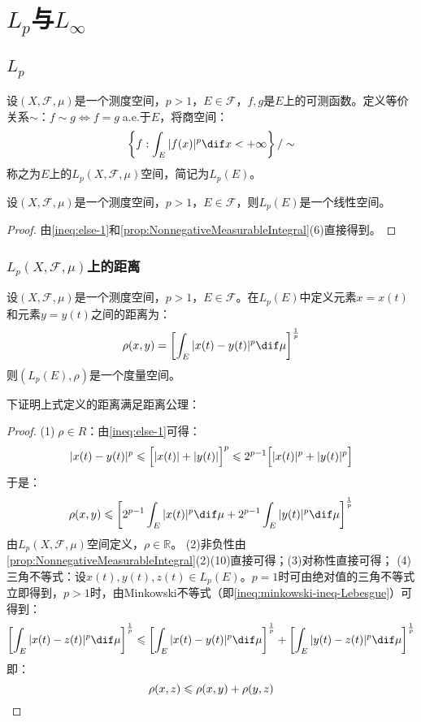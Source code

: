 \section{$L_p$与$L_{\infty}$}

\subsection{$L_p$}
\begin{definition}
	设$(X,\mathscr{F},\mu)$是一个测度空间，$p>1$，$E\in\mathscr{F}$，$f,g$是$E$上的可测函数。定义等价关系$\sim$：$f\sim g\Leftrightarrow f=g\;$a.e.于$E$，将商空间：
	\begin{equation*}
		\left\{f:\int_{E}^{}|f(x)|^p\dif x<+\infty\right\}/\sim
	\end{equation*}
	称之为$E$上的$L_p(X,\mathscr{F},\mu)$空间，简记为$L_p(E)$。
\end{definition}
\begin{property}
	设$(X,\mathscr{F},\mu)$是一个测度空间，$p>1$，$E\in\mathscr{F}$，则$L_p(E)$是一个线性空间。
\end{property}
\begin{proof}
	由\cref{ineq:else-1}和\cref{prop:NonnegativeMeasurableIntegral}(6)直接得到。
\end{proof}
\subsubsection{$L_p(X,\mathscr{F},\mu)$上的距离}
\begin{definition}
	设$(X,\mathscr{F},\mu)$是一个测度空间，$p>1$，$E\in\mathscr{F}$。在$L_p(E)$中定义元素$x=x(t)$和元素$y=y(t)$之间的距离为：
	\begin{equation*}
		\rho(x,y)=\left[\int_{E}^{}|x(t)-y(t)|^p\dif\mu\right]^\frac{1}{p}
	\end{equation*}
	则$(L_p(E),\rho)$是一个度量空间。
\end{definition}
下证明上式定义的距离满足距离公理：
\begin{proof}
	(1)$\;\rho\in R$：由\cref{ineq:else-1}可得：
	\begin{equation*}
		|x(t)-y(t)|^p\leqslant\Bigl[|x(t)|+|y(t)|\Bigr]^p\leqslant2^{p-1}\Bigl[|x(t)|^p+|y(t)|^p\Bigr]
	\end{equation*}
	于是：
	\begin{equation*}
		\rho(x,y)\leqslant\left[2^{p-1}\int_{E}^{}|x(t)|^p\dif\mu+2^{p-1}\int_{E}^{}|y(t)|^p\dif\mu\right]^{\frac{1}{p}}
	\end{equation*}
	由$L_p(X,\mathscr{F},\mu)$空间定义，$\rho\in\mathbb{R}$。
	(2)非负性由\cref{prop:NonnegativeMeasurableIntegral}(2)(10)直接可得；(3)对称性直接可得；
	(4)三角不等式：设$x(t),y(t),z(t)\in L_p(E)$。$p=1$时可由绝对值的三角不等式立即得到，$p>1$时，由Minkowski不等式（即\cref{ineq:minkowski-ineq-Lebesgue}）可得到：
	\begin{equation*}
		\left[\int_{E}|x(t)-z(t)|^p\dif\mu\right]^{\frac{1}{p}} \leqslant \left[\int_{E}|x(t)-y(t)|^p\dif\mu\right]^{\frac{1}{p}} + \left[\int_{E}|y(t)-z(t)|^p\dif\mu\right]^{\frac{1}{p}}
	\end{equation*}
	即：
	\begin{equation*}
		\rho(x,z)\leqslant\rho(x,y)+\rho(y,z)\qedhere
	\end{equation*}
\end{proof}
